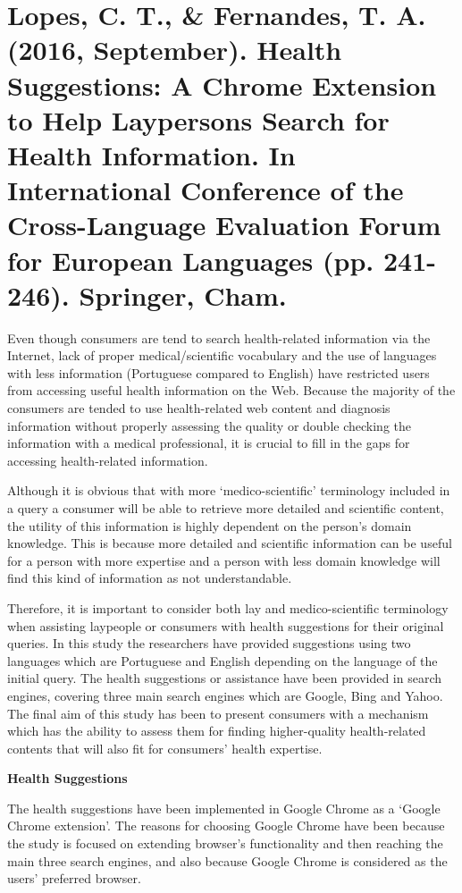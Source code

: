 \documentclass[]{article}
\begin{document}
\section{Lopes, C. T., \& Fernandes, T. A. (2016, September). Health Suggestions: A Chrome Extension to Help Laypersons Search for Health Information. In International Conference of the Cross-Language Evaluation Forum for European Languages (pp. 241-246). Springer, Cham.}

Even though consumers are tend to search health-related information via the Internet, lack of proper medical/scientific vocabulary and the use of languages with less information (Portuguese compared to English) have restricted users from accessing useful health information on the Web. Because the majority of the consumers are tended to use health-related web content and diagnosis information without properly assessing the quality or double checking the information with a medical professional, it is crucial to fill in the gaps for accessing health-related information.   

Although it is obvious that with more ‘medico-scientific’ terminology included in a query a consumer will be able to retrieve more detailed and scientific content, the utility of this information is highly dependent on the person’s domain knowledge. This is because more detailed and scientific information can be useful for a person with more expertise and a person with less domain knowledge will find this kind of information as not understandable. 
   
Therefore, it is important to consider both lay and medico-scientific terminology when assisting laypeople or consumers with health suggestions for their original queries. In this study the researchers have provided suggestions using two languages which are Portuguese and English depending on the language of the initial query. The health suggestions or assistance have been provided in search engines, covering three main search engines which are Google, Bing and Yahoo. The final aim of this study has been to present consumers with a mechanism which has the ability to assess them for finding higher-quality health-related contents that will also fit for consumers’ health expertise.      

\textbf{Health Suggestions}

The health suggestions have been implemented in Google Chrome as a ‘Google Chrome extension’. The reasons for choosing Google Chrome have been because the study is focused on extending browser’s functionality and then reaching the main three search engines, and also because Google Chrome is considered as the users’ preferred browser.   
\end{document}

